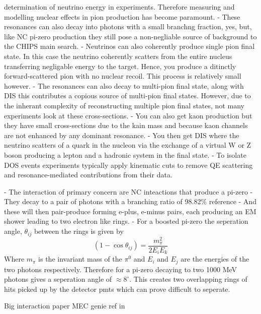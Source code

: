 determination of neutrino energy in experiments. Therefore measuring and modelling nuclear effects
in pion production has become paramount.
- These resonances can also decay into photons with a small branchng fraction, yes, but, like NC
pi-zero production they still pose a non-negliable source of background to the CHIPS main search.
- Neutrinos can also coherently produce single pion final state. In this case the neutrino
coherently scatters from the entire nucleus transferring negligable energy to the target. Hence,
you produce a ditinctly forward-scattered pion with no nuclear recoil. This process is relatively
small however.
- The resonances can also decay to multi-pion final state, along with DIS this contributes a
copious source of multi-pion final states. However, due to the inherant complexity of
reconstructing multiple pion final states, not many experiments look at these cross-sections.
- You can also get kaon production but they have small cross-sections due to the kain mass and
because kaon channels are not enhanced by any dominant resonance.
- You then get DIS where the neutrino scatters of a quark in the nucleon via the exchange of a
virtual W or Z boson producing a lepton and a hadronic system in the final state.
- To isolate DOS events experiments typically apply kinematic cuts to remove QE scattering and
resonance-mediated contributions from their data.

- The interaction of primary concern are NC inteactions that produce a pi-zero
- They decay to a pair of photons with a branching ratio of 98.82\% reference
- And these will then pair-produce forming e-plus, e-minus pairs, each producing an EM shower
leading to two electron like rings.
- For a boosted pi-zero the seperation angle, $\theta_{ij}$ between the rings is given by
\begin{equation}
    (1-\cos\theta_{ij})=\frac{m_{\pi}^2}{2E_{i}E_{k}}
\end{equation}
Where $m_{\pi}$ is the invariant mass of the $\pi^{0}$ and $E_{i}$ and $E_{j}$ are the energies
of the two photons respectively.
Therefore for a pi-zero decaying to two 1000 MeV photons gives a seperation angle of
$\approx 8^{\circ}$. This creates two overlapping rings of hits picked up by the detector pmts
which can prove difficult to seperate.

Big interaction paper \cite{formaggio2012}
MEC genie ref in \cite{katori2013}


